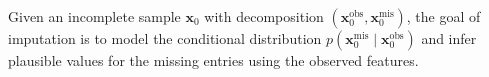 \documentclass[times, review, 10pt]{elsarticle}
\begin{document}
Given an incomplete sample $\mathbf{x}_0$ with decomposition $(\mathbf{x}_0^{\mathrm{obs}}, \mathbf{x}_0^{\mathrm{mis}})$, the goal of imputation is to model the conditional distribution
$p(\mathbf{x}^{\mathrm{mis}}_0 \mid \mathbf{x}^{\mathrm{obs}}_0)$
and infer plausible values for the missing entries using the observed features.






\end{document}
